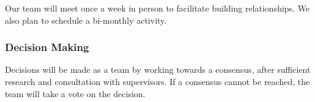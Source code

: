 \documentclass{article}
\begin{document}
\begin{comment}
\wss{How will you build team cohesion (fun time, group rituals, etc.)? }
\end{comment}
Our team will meet once a week in person to facilitate building relationships. We also plan to schedule a bi-monthly activity. 
\subsubsection*{Decision Making} 

\begin{comment}
\wss{How will you make decisions in your group? Consensus?  Vote? How will you
handle disagreements? }

\end{comment}
Decisions will be made as a team by working towards a consensus, after sufficient research and consultation with supervisors. If a consensus cannot be reached, the team will take a vote on the decision.
\end{document}
